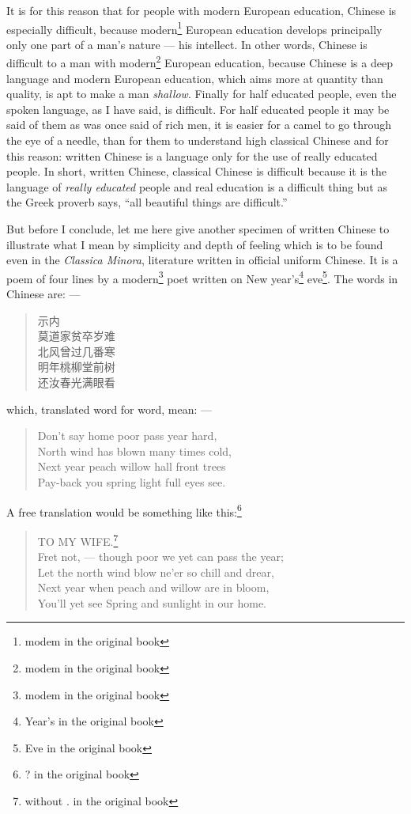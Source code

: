It is for this reason that for people with modern European education, Chinese is especially difficult, because modern\footnote{modem in the original book} European education develops principally only one part of a man's nature --- his intellect.
In other words, Chinese is difficult to a man with modern\footnote{modem in the original book} European education, because Chinese is a deep language and modern European education, which aims more at quantity than quality, is apt to make a man \emph{shallow}.
Finally for half educated people, even the spoken language, as I have said, is difficult.
For half educated people it may be said of them as was once said of rich men, it is easier for a camel to go through the eye of a needle, than for them to understand high classical Chinese and for this reason: written Chinese is a language only for the use of really educated people.
In short, written Chinese, classical Chinese is difficult because it is the language of \emph{really educated} people and real education is a difficult thing but as the Greek proverb says, ``all beautiful things are difficult.''

But before I conclude, let me here give another specimen of written Chinese to illustrate what I mean by simplicity and depth of feeling which is to be found even in the \emph{Classica Minora}, literature written in official uniform Chinese.
It is a poem of four lines by a modern\footnote{modem in the original book} poet written on New year's\footnote{Year's in the original book} eve\footnote{Eve in the original book}.
The words in Chinese are: ---
\begin{quote}\footnotesize
    \qquad 示内 \\
    莫道家贫卒岁难 \\
    北风曾过几番寒 \\
    明年桃柳堂前树 \\
    还汝春光满眼看 \\
\end{quote}
which, translated word for word, mean: ---
\begin{quote}\footnotesize
    Don't say home poor pass year hard, \\
    North wind has blown many times cold, \\
    Next year peach willow hall front trees \\
    Pay-back you spring light full eyes see. \\
\end{quote}
A free translation would be something like this:\footnote{? in the original book}
\begin{quote}\footnotesize
    \qquad \qquad TO MY WIFE.\footnote{without . in the original book} \\
    Fret not, --- though poor we yet can pass the year; \\
    Let the north wind blow ne'er so chill and drear, \\
    Next year when peach and willow are in bloom, \\
    You'll yet see Spring and sunlight in our home.
\end{quote}


